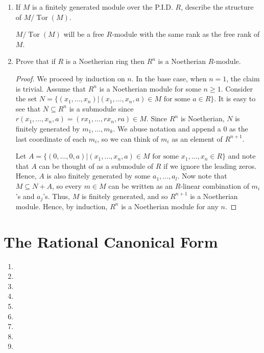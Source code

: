 \documentclass{report}
\DeclareMathOperator{\Tor}{Tor}
\DeclareMathOperator{\An}{Ann}
\begin{document}
\begin{enumerate}
\begin{proof}
			When $N$ is a finitely generated torsion $R$-module, simply let $r=r_1...r_m$ where $r_ia_i=0$ for each generator $a_i$. Then $ra_i=0$ for all $a_i$,
			and hence $r\in\An(N)$.
		\end{proof}
		
		\setcounter{enumi}{12}
	\item If $M$ is a finitely generated module over the P.I.D. $R$, describe the structure of $M / \Tor(M)$.
		\newline

		$M / \Tor(M)$ will be a free $R$-module with the same rank as the free rank of $M$.
		\setcounter{enumi}{14}
	\item Prove that if $R$ is a Noetherian ring then $R^n$ is a Noetherian $R$-module.
		\begin{proof}
			We proceed by induction on $n$. In the base case, when $n=1$, the claim is trivial. Assume that $R^{n}$ is a Noetherian module for some $n\geq 1$.
			Consider the set $N=\{(x_1,...,x_n)|(x_1,...,x_n,a)\in M\text{ for some } a\in R \}$.
			It is easy to see that $N\subseteq R^n$ is a submodule since $r(x_1,...,x_n,a)=(rx_1,...,rx_n,ra)\in M$.
			Since $R^n$ is Noetherian, $N$ is finitely generated by $m_1,...,m_k$. We abuse notation and append a $0$ as the last coordinate of each $m_i$,
			so we can think of $m_i$ as an element of $R^{n+1}$. 
			\newline

			Let $A=\{(0,...,0,a)|(x_1,...,x_n,a)\in M \text{ for some }x_1,...,x_n \in R\}$ and note that $A$ can be thought of as a submodule of $R$ if we ignore the leading zeros.
			Hence, $A$ is also finitely generated by some $a_1,...,a_l$. Now note that $M\subseteq N+A$, so every $m\in M$ can be written as an
			$R$-linear combination of $m_i$'s and $a_j$'s. Thus, $M$ is finitely generated, and so $R^{n+1}$ is a Noetherian module.
			Hence, by induction, $R^n$ is a Noetherian module for any $n$.
		\end{proof}
\end{enumerate}
\section{The Rational Canonical Form}
\begin{enumerate} 
	\item 
		\setcounter{enumi}{2}
	\item 
	\item 
	\item 
	\item 
		\setcounter{enumi}{7}
	\item 
		\setcounter{enumi}{10}
	\item 
		\setcounter{enumi}{16}
	\item 
	\item 
\end{enumerate}
\end{document}
